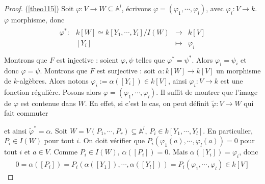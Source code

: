             \begin{proof} (\ref{theo115})
                Soit $\varphi : V \to W \subseteq \mathbb{A}^l$, écrivons $\varphi = (\varphi_1, \cdots, \varphi_l)$, avec $\varphi_i : V \to k$. $\varphi$ morphisme, donc
                \begin{align*}
                    \begin{array}{cccc}
                        \varphi^* : & k[W] \simeq k[Y_1, \cdots, Y_l]/I(W) & \to & k[V] \\
                        & [Y_i] & \mapsto & \varphi_i \\
                    \end{array}
                \end{align*}
                Montrons que $F$ est injective : soient $\varphi, \psi$ telles que $\varphi^* = \psi^*$. Alors $\varphi_i = \psi_i$ et donc $\varphi = \psi$. Montrons que $F$ est surjective : soit $\alpha : k[W] \to k[V]$ un morphisme de $k$-algèbres. Alors notons $\varphi_i := \alpha([Y_i]) \in k[V]$, ainsi $\varphi_i : V \to k$ est une fonction régulière. Posons alors $\varphi = (\varphi_1, \cdots, \varphi_l)$. Il suffit de montrer que l'image de $\varphi$ est contenue dans $W$. En effet, si c'est le cas, on peut définit $\tilde \varphi : V \to W$ qui fait commuter
                \begin{figure}[H]
                    \centering
                \end{figure} \noindent
                et ainsi $\tilde \varphi ^* = \alpha$. Soit $W = V(P_1, \cdots, P_r) \subseteq \mathbb{A}^l$, $P_i \in k[Y_1, \cdots, Y_l]$. En particulier, $P_i \in I(W)$ pour tout $i$. On doit vérifier que $P_i(\varphi_1(a), \cdots, \varphi_l(a)) = 0$ pour tout $i$ et $a \in V$. Comme $P_i \in I(W)$, $\alpha([P_i]) = 0$. Mais $\alpha([Y_i]) = \varphi_i$, donc 
                \begin{align*}
                    0 = \alpha([P_i]) = P_i(\alpha([Y_1]), \cdots, \alpha([Y_l])) = P_i(\varphi_1, \cdots, \varphi_l) \in k[V]
                \end{align*}
            \end{proof}
